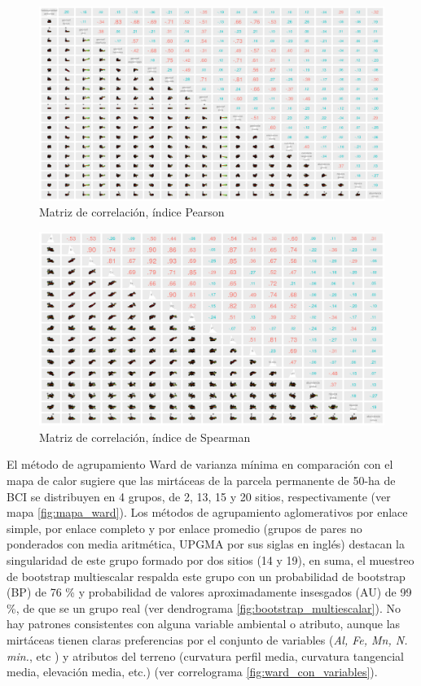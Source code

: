 \documentclass[11pt,]{article}
\begin{document}
\begin{figure}
\centering
\includegraphics{matriz_correlacion_geomorf_abun_riq_spearman.png}
\caption{Matriz de correlación, índice Pearson
\label{fig:matriz_pearson}}
\end{figure}

\begin{figure}
\centering
\includegraphics{matriz_correlacion_suelo_abun_riq_spearman.png}
\caption{Matriz de correlación, índice de Spearman
\label{fig:matriz_spearman}}
\end{figure}

El método de agrupamiento Ward de varianza mínima en comparación con el
mapa de calor sugiere que las mirtáceas de la parcela permanente de
50-ha de BCI se distribuyen en 4 grupos, de 2, 13, 15 y 20 sitios,
respectivamente (ver mapa \ref{fig:mapa_ward}). Los métodos de
agrupamiento aglomerativos por enlace simple, por enlace completo y por
enlace promedio (grupos de pares no ponderados con media aritmética,
UPGMA por sus siglas en inglés) destacan la singularidad de este grupo
formado por dos sitios (14 y 19), en suma, el muestreo de bootstrap
multiescalar respalda este grupo con un probabilidad de bootstrap (BP)
de 76 \% y probabilidad de valores aproximadamente insesgados (AU) de 99
\%, de que se un grupo real (ver dendrograma
\ref {fig:bootstrap_multiescalar}). No hay patrones consistentes con
alguna variable ambiental o atributo, aunque las mirtáceas tienen claras
preferencias por el conjunto de variables (\emph{Al, Fe, Mn, N. min.},
etc ) y atributos del terreno (curvatura perfil media, curvatura
tangencial media, elevación media, etc.) (ver correlograma
\ref{fig:ward_con_variables}).
\end{document}
